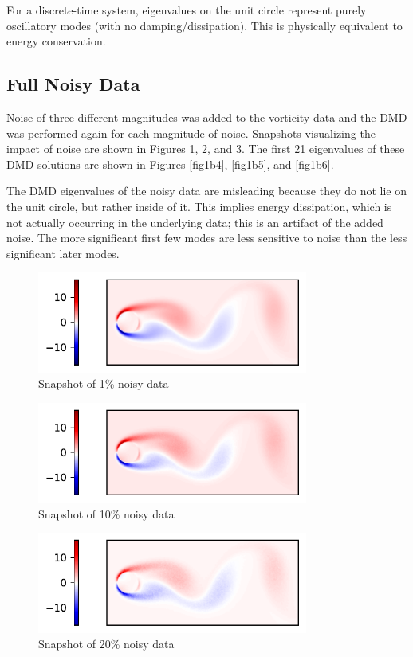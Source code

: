 \documentclass[11pt]{article}
\begin{document}
For a discrete-time system, eigenvalues on the unit circle represent purely oscillatory modes (with no damping/dissipation). This is physically equivalent to energy conservation.

\subsection{Full Noisy Data} %

Noise of three different magnitudes was added to the vorticity data and the DMD was performed again for each magnitude of noise. Snapshots visualizing the impact of noise are shown in Figures \ref{fig1b1}, \ref{fig1b2}, and \ref{fig1b3}. The first 21 eigenvalues of these DMD solutions are shown in Figures \ref{fig1b4}, \ref{fig1b5}, and \ref{fig1b6}.

The DMD eigenvalues of the noisy data are misleading because they do not lie on the unit circle, but rather inside of it. This implies energy dissipation, which is not actually occurring in the underlying data; this is an artifact of the added noise. The more significant first few modes are less sensitive to noise than the less significant later modes.

\begin{figure}[H]
    \centering
    \includegraphics[width=3.5in]{fig1b_snapshot_1.pdf}
    \caption{Snapshot of 1\% noisy data}
    \label{fig1b1}
\end{figure}

\begin{figure}[H]
    \centering
    \includegraphics[width=3.5in]{fig1b_snapshot_2.pdf}
    \caption{Snapshot of 10\% noisy data}
    \label{fig1b2}
\end{figure}

\begin{figure}[H]
    \centering
    \includegraphics[width=3.5in]{fig1b_snapshot_3.pdf}
    \caption{Snapshot of 20\% noisy data}
    \label{fig1b3}
\end{figure}
\end{document}
